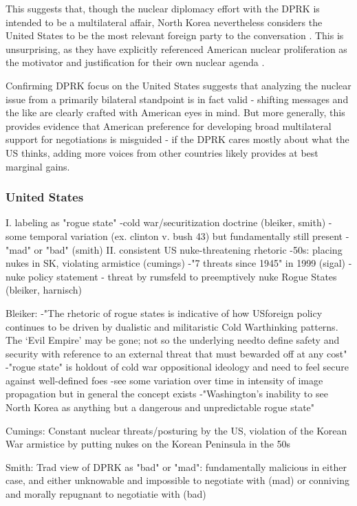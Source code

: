 \documentclass{article}
\begin{document}
This suggests that, though the nuclear diplomacy effort with the DPRK is intended to be a multilateral affair, North Korea nevertheless considers the United States to be the most relevant foreign party to the conversation \cite{rich14}. This is unsurprising, as they have explicitly referenced American nuclear proliferation as the motivator and justification for their own nuclear agenda \cite{kcna, kcna3, kcna4}.

Confirming DPRK focus on the United States suggests that analyzing the nuclear issue from a primarily bilateral standpoint is in fact valid - shifting messages and the like are clearly crafted with American eyes in mind. But more generally, this provides evidence that American preference for developing broad multilateral support for negotiations is misguided - if the DPRK cares mostly about what the US thinks, adding more voices from other countries likely provides at best marginal gains.

\subsubsection{United States}

I. labeling as "rogue state"
	-cold war/securitization doctrine (bleiker, smith)
	-some temporal variation (ex. clinton v. bush 43) but fundamentally still present
	-"mad" or "bad" (smith)
II. consistent US nuke-threatening rhetoric
	-50s: placing nukes in SK, violating armistice (cumings)
	-"7 threats since 1945" in 1999 (sigal)
	-nuke policy statement - threat by rumsfeld to preemptively nuke Rogue States (bleiker, harnisch)

Bleiker:
-"The rhetoric of rogue states is indicative of how USforeign policy continues to be driven by dualistic and militaristic Cold Warthinking patterns. The ‘Evil Empire’ may be gone; not so the underlying needto define safety and security with reference to an external threat that must bewarded off at any cost"
-"rogue state" is holdout of cold war oppositional ideology and need to feel secure against well-defined foes
	-see some variation over time in intensity of image propagation but in general the concept exists
-"Washington's inability to see North Korea as anything but a dangerous and unpredictable rogue state"

Cumings: Constant nuclear threats/posturing by the US, violation of the Korean War armistice by putting nukes on the Korean Peninsula in the 50s

Smith: Trad view of DPRK as "bad" or "mad": fundamentally malicious in either case, and either unknowable and impossible to negotiate with (mad) or conniving and morally repugnant to negotiatie with (bad)
\end{document}
